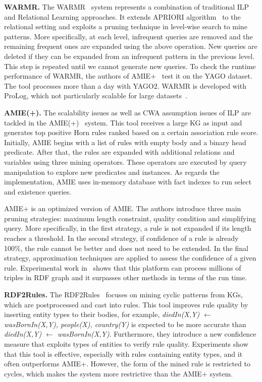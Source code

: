 \textbf{WARMR.} The WARMR~\cite{ref16, ref17} system represents a combination of traditional ILP and Relational Learning approaches. It extends APRIORI algorithm~\cite{ref44} to the relational setting and exploits a pruning technique in level-wise search to mine patterns. More specifically, at each level, infrequent queries are removed and the remaining frequent ones are expanded using the above operation. New queries are deleted if they can be expanded from an infrequent pattern in the previous level. This step is repeated until we cannot generate new queries. To check the runtime performance of WARMR, the authors of AMIE+~\cite{ref10} test it on the YAGO dataset. The tool processes more than a day with YAGO2. WARMR is developed with ProLog, which not particularly scalable for large datasets~\cite{ref10}.

\textbf{AMIE(+).} The scalability issues as well as CWA assumption issues of ILP are tackled in the AMIE(+)~\cite{ref10} system. This tool receives a large KG as input and generates top positive Horn rules ranked based on a certain association rule score. Initially, AMIE begins with a list of rules with empty body and a binary head predicate. After that, the rules are expanded with additional relations and variables using three mining operators. These operators are executed by query manipulation to explore new predicates and instances. As regards the implementation, AMIE uses in-memory database with fact indexes to run select and existence queries.

AMIE+ is an optimized version of AMIE. The authors introduce three main pruning strategies: maximum length constraint, quality condition and simplifying query. More specifically, in the first strategy, a rule is not expanded if its length reaches a threshold. In the second strategy, if confidence of a rule is already 100\%, the rule cannot be better and does not need to be extended. In the final strategy, approximation techniques are applied to assess the confidence of a given rule. Experimental work in~\cite{ref10} shows that this platform can process millions of triples in RDF graph and it surpasses other methods in terms of the run time.

\textbf{RDF2Rules.} The RDF2Rules~\cite{ref29} focuses on mining cyclic patterns from KGs, which are postprocessed and cast into rules. This tool improves rule quality by inserting entity types to their bodies, for example, \textit{diedIn(X,Y) $\leftarrow$ wasBornIn(X,Y), people(X), country(Y)} is expected to be more accurate than \textit{diedIn(X,Y) $\leftarrow$ wasBornIn(X,Y)}. Furthermore, they introduce a new confidence measure that exploits types of entities to verify rule quality. Experiments show that this tool is effective, especially with rules containing entity types, and it often outperforms AMIE+. However, the form of the mined rule is restricted to cycles, which makes the system more restrictive than the AMIE+ system.

